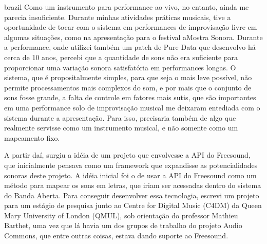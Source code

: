 \begin{otherlanguage*}{brazil}
Como um instrumento para performance ao vivo, no entanto, ainda me parecia insuficiente. Durante minhas atividades práticas musicais, tive a oportunidade de tocar com o sistema em performances de improvisação livre em algumas situações, como na apresentação para o festival aMostra Sonora. Durante a performance, onde utilizei também um patch de Pure Data que desenvolvo há cerca de 10 anos, percebi que a quantidade de sons não era suficiente para proporcionar uma variação sonora satisfatória em performances longas. O sistema, que é propositalmente simples, para que seja o mais leve possível, não permite processamentos mais complexos do som, e por mais que o conjunto de sons fosse grande, a falta de controle em fatores mais sutis, que são importantes em uma performance solo de improvisação musical me deixaram entediada com o sistema durante a apresentação. Para isso, precisaria também de algo que realmente servisse como um instrumento musical, e não somente como um mapeamento fixo. 

A partir daí, surgiu a idéia de um projeto que envolvesse a API do Freesound, que inicialmente pensava como um framework que expandisse as potencialidades sonoras deste projeto. A idéia inicial foi o de usar a API do Freesound como um método para mapear os sons em letras, que iriam ser acessadas dentro do sistema do Banda Aberta. Para conseguir desenvolver essa tecnologia, escrevi um projeto para um estágio de pesquisa junto ao Centre for Digital Music (C4DM) da Queen Mary University of London (QMUL),  sob orientação do professor Mathieu Barthet, uma vez que lá havia um dos grupos de trabalho do projeto Audio Commons, que entre outras coisas, estava dando suporte ao Freesound. 




\end{otherlanguage*}



